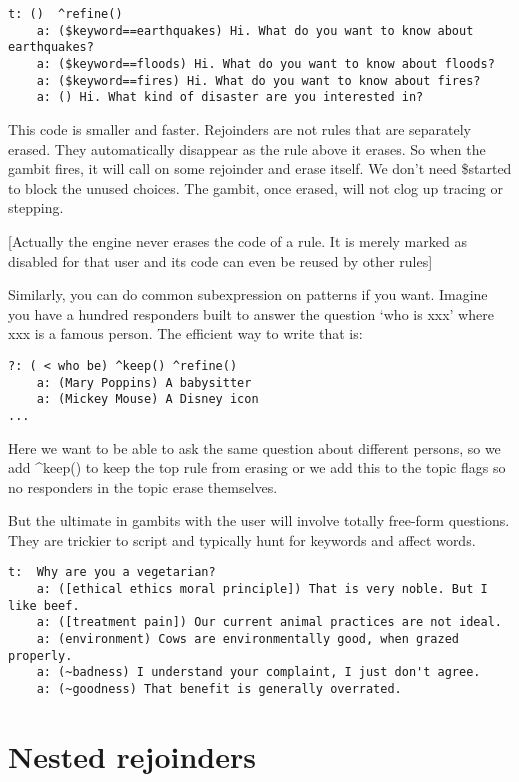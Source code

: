 \documentclass[]{article}
\begin{document}
\begin{verbatim}
t: ()  ^refine()
    a: ($keyword==earthquakes) Hi. What do you want to know about earthquakes? 
    a: ($keyword==floods) Hi. What do you want to know about floods? 
    a: ($keyword==fires) Hi. What do you want to know about fires? 
    a: () Hi. What kind of disaster are you interested in? 
\end{verbatim}

This code is smaller and faster. Rejoinders are not rules that are
separately erased. They automatically disappear as the rule above it
erases. So when the gambit fires, it will call on some rejoinder and
erase itself. We don't need \$started to block the unused choices. The
gambit, once erased, will not clog up tracing or stepping.

{[}Actually the engine never erases the code of a rule. It is merely
marked as disabled for that user and its code can even be reused by
other rules{]}

Similarly, you can do common subexpression on patterns if you want.
Imagine you have a hundred responders built to answer the question `who
is xxx' where xxx is a famous person. The efficient way to write that
is:

\begin{verbatim}
?: ( < who be) ^keep() ^refine()
    a: (Mary Poppins) A babysitter
    a: (Mickey Mouse) A Disney icon
...
\end{verbatim}

Here we want to be able to ask the same question about different
persons, so we add \^{}keep() to keep the top rule from erasing or we
add this to the topic flags so no responders in the topic erase
themselves.

But the ultimate in gambits with the user will involve totally free-form
questions. They are trickier to script and typically hunt for keywords
and affect words.

\begin{verbatim}
t:  Why are you a vegetarian?
    a: ([ethical ethics moral principle]) That is very noble. But I like beef.
    a: ([treatment pain]) Our current animal practices are not ideal.
    a: (environment) Cows are environmentally good, when grazed properly.
    a: (~badness) I understand your complaint, I just don't agree.
    a: (~goodness) That benefit is generally overrated.
\end{verbatim}

\section{Nested rejoinders}\label{nested-rejoinders}
\end{document}
